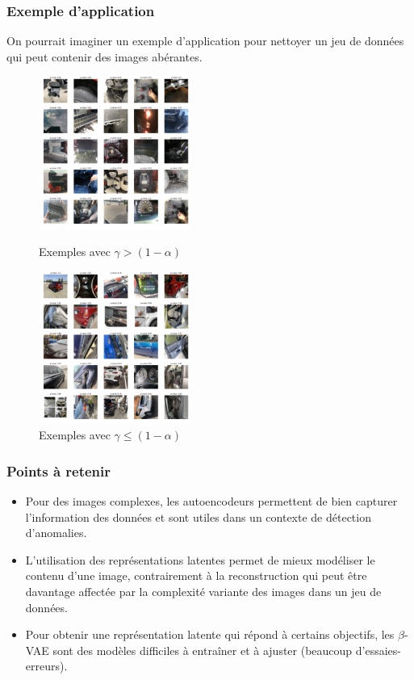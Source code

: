 \documentclass{beamer}
\begin{document}
	\begin{frame}
		\frametitle{Exemple d'application}
		
		On pourrait imaginer un exemple d'application pour nettoyer un jeu de données qui peut contenir des images abérantes.
		
		\begin{figure}
			\centering
			\begin{minipage}{.45\textwidth}
				\includegraphics[width=5cm]{images/bad.pdf}
				\caption{Exemples avec $\gamma > (1 - \alpha)$}
			\end{minipage}\hfill
			\begin{minipage}{.45\textwidth}
				\includegraphics[width=5cm]{images/good.pdf}
				\caption{Exemples avec $\gamma \le (1 - \alpha)$}
			\end{minipage}
		\end{figure}
		
	\end{frame}
	
	\begin{frame}
		\frametitle{Points à retenir}
		
		\begin{itemize}
			\item Pour des images complexes, les autoencodeurs permettent de bien capturer l'information des données et sont utiles dans un contexte de détection d'anomalies.
			\item L'utilisation des représentations latentes permet de mieux modéliser le contenu d'une image, contrairement à la reconstruction qui peut être davantage affectée par la complexité variante des images dans un jeu de données.
			\item Pour obtenir une représentation latente qui répond à certains objectifs, les $\beta$-VAE sont des modèles difficiles à entraîner et à ajuster (beaucoup d'essaies-erreurs).
		\end{itemize}
	
	\end{frame}
\end{document}
